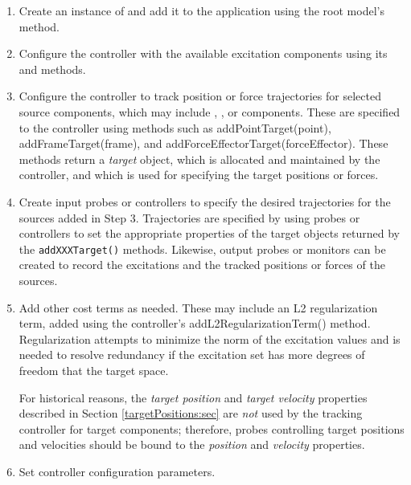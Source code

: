 \begin{enumerate}

\item Create an instance of 
 and add it to the application
using the root model's
 method.

\item Configure the controller with the available excitation components 
using its
and
methods.

\item Configure the controller to track position or force
trajectories for selected source components, which may include
,
,
or 
components. These are specified to the controller using methods such as
%
{addPointTarget(point)},
%
{addFrameTarget(frame)},
and 
%
{addForceEffectorTarget(forceEffector)}. These methods return a {\it target}
object, which is allocated and maintained by the controller, and which is used
for specifying the target positions or forces.

\item Create input probes or controllers to specify the desired
trajectories for the sources added in Step 3. Trajectories are specified by
using probes or controllers to set the appropriate properties of the
target objects returned by the {\tt addXXXTarget()} methods.  Likewise, output
probes or monitors can be created to record the excitations and the tracked
positions or forces of the sources.

\item Add other cost terms as needed. These may include
an L2 regularization term, added using the controller's
%
{addL2RegularizationTerm()} method. Regularization attempts to minimize the norm
of the excitation values and is needed to resolve redundancy if the excitation
set has more degrees of freedom that the target space.

\begin{sideblock}
For historical reasons, the {\it target position} and {\it target velocity}
properties described in Section \ref{targetPositions:sec} are {\it not} used by
the tracking controller for target components; therefore, probes controlling
target positions and velocities should be bound to the {\it position} and {\it
velocity} properties.
\end{sideblock}

\item Set controller configuration parameters.

\end{enumerate}

